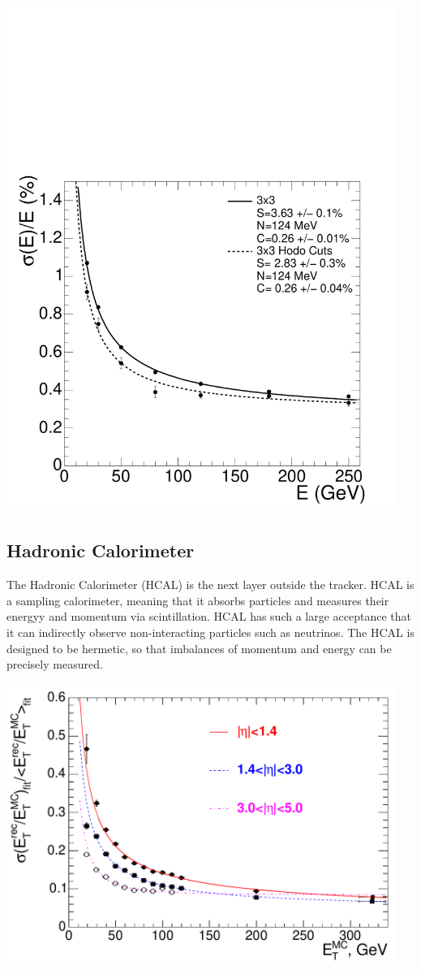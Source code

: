 \centerline{
\includegraphics[width=5in]{Chapter3/importfigs/Figure_001-007.pdf}
}
 
\subsection{Hadronic Calorimeter}

The Hadronic Calorimeter (HCAL) is the next layer outside the tracker. HCAL is a sampling calorimeter, meaning that it absorbs particles and measures their energyy and momentum via scintillation. HCAL has such a large acceptance that it can indirectly observe non-interacting particles such as neutrinos. The HCAL is designed to be hermetic, so that imbalances of momentum and energy can be precisely measured.

\centerline{
\includegraphics[width=5in]{Chapter3/importfigs/Figure_001-008.pdf}
}

